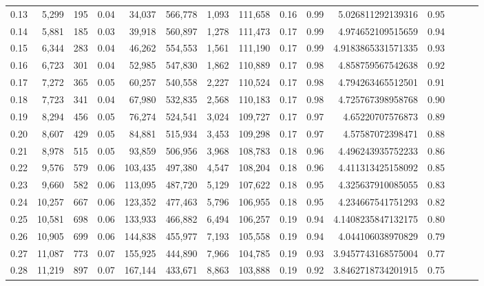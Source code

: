 \begin{tabular}{rrrrrrrrrrrrrrr}
0.13 &   5,299 &    195 &  0.04 &   34,037 &  566,778 &    1,093 &  111,658 &  0.16 &  0.99 &      5.026811292139316 &      0.95 \\
0.14 &   5,881 &    185 &  0.03 &   39,918 &  560,897 &    1,278 &  111,473 &  0.17 &  0.99 &      4.974652109515659 &      0.94 \\
0.15 &   6,344 &    283 &  0.04 &   46,262 &  554,553 &    1,561 &  111,190 &  0.17 &  0.99 &     4.9183865331571335 &      0.93 \\
0.16 &   6,723 &    301 &  0.04 &   52,985 &  547,830 &    1,862 &  110,889 &  0.17 &  0.98 &      4.858759567542638 &      0.92 \\
0.17 &   7,272 &    365 &  0.05 &   60,257 &  540,558 &    2,227 &  110,524 &  0.17 &  0.98 &      4.794263465512501 &      0.91 \\
0.18 &   7,723 &    341 &  0.04 &   67,980 &  532,835 &    2,568 &  110,183 &  0.17 &  0.98 &      4.725767398958768 &      0.90 \\
0.19 &   8,294 &    456 &  0.05 &   76,274 &  524,541 &    3,024 &  109,727 &  0.17 &  0.97 &       4.65220707576873 &      0.89 \\
0.20 &   8,607 &    429 &  0.05 &   84,881 &  515,934 &    3,453 &  109,298 &  0.17 &  0.97 &       4.57587072398471 &      0.88 \\
0.21 &   8,978 &    515 &  0.05 &   93,859 &  506,956 &    3,968 &  108,783 &  0.18 &  0.96 &      4.496243935752233 &      0.86 \\
0.22 &   9,576 &    579 &  0.06 &  103,435 &  497,380 &    4,547 &  108,204 &  0.18 &  0.96 &      4.411313425158092 &      0.85 \\
0.23 &   9,660 &    582 &  0.06 &  113,095 &  487,720 &    5,129 &  107,622 &  0.18 &  0.95 &      4.325637910085055 &      0.83 \\
0.24 &  10,257 &    667 &  0.06 &  123,352 &  477,463 &    5,796 &  106,955 &  0.18 &  0.95 &      4.234667541751293 &      0.82 \\
0.25 &  10,581 &    698 &  0.06 &  133,933 &  466,882 &    6,494 &  106,257 &  0.19 &  0.94 &     4.1408235847132175 &      0.80 \\
0.26 &  10,905 &    699 &  0.06 &  144,838 &  455,977 &    7,193 &  105,558 &  0.19 &  0.94 &      4.044106038970829 &      0.79 \\
0.27 &  11,087 &    773 &  0.07 &  155,925 &  444,890 &    7,966 &  104,785 &  0.19 &  0.93 &     3.9457743168575004 &      0.77 \\
0.28 &  11,219 &    897 &  0.07 &  167,144 &  433,671 &    8,863 &  103,888 &  0.19 &  0.92 &     3.8462718734201915 &      0.75 \\

\end{tabular}

